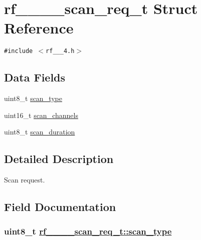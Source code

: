 \hypertarget{structrf__802__15__4__scan__req__t}{
\section{rf\_\_\_\_\-scan\_\-req\_\-t Struct Reference}
\label{structrf__802__15__4__scan__req__t}
}
{\tt \#include $<$rf\_\_\_\-4.h$>$}

\subsection*{Data Fields}
\begin{CompactItemize}
\item 
uint8\_\-t \hyperlink{structrf__802__15__4__scan__req__t_a1bd396edfc7bc51c6eaf706c95180a1}{scan\_\-type}
\item 
uint16\_\-t \hyperlink{structrf__802__15__4__scan__req__t_8fe91abc47377e746610fdfc77fe32c4}{scan\_\-channels}
\item 
uint8\_\-t \hyperlink{structrf__802__15__4__scan__req__t_7ece7fa7b4a28db1ba5b3375ab820f82}{scan\_\-duration}
\end{CompactItemize}


\subsection{Detailed Description}
Scan request. 



\subsection{Field Documentation}
\hypertarget{structrf__802__15__4__scan__req__t_a1bd396edfc7bc51c6eaf706c95180a1}{
\subsubsection[scan\_\-type]{\setlength{\rightskip}{0pt plus 5cm}uint8\_\-t \hyperlink{structrf__802__15__4__scan__req__t_a1bd396edfc7bc51c6eaf706c95180a1}{rf\_\_\_\_\-scan\_\-req\_\-t::scan\_\-type}}}
\label{structrf__802__15__4__scan__req__t_a1bd396edfc7bc51c6eaf706c95180a1}


